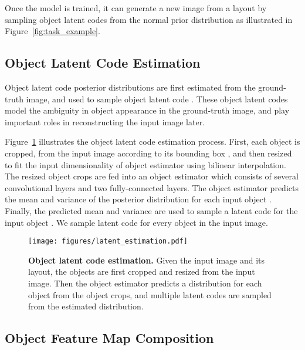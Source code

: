 \documentclass[10pt,twocolumn,letterpaper]{article}
\begin{document}
Once the model is trained, it can generate a new image from a layout by sampling object latent codes from the normal prior distribution  as illustrated in Figure~\ref{fig:task_example}.









\subsection{Object Latent Code Estimation}
Object latent code posterior distributions are first estimated from the ground-truth image, and used to sample object latent code . 
These object latent codes model the ambiguity in object appearance in the ground-truth image, and play important roles in reconstructing the input image later.

Figure~\ref{fig:latent_code_estimation} illustrates the object latent code estimation process.
First, each object  is cropped, from the input image  according to its bounding box , and then resized to fit the input dimensionality of object estimator using bilinear interpolation. 
The resized object crops are fed into an object estimator which consists of several convolutional layers and two fully-connected layers. The object estimator predicts the mean and variance of the posterior distribution for each input object . 
Finally, the predicted mean and variance are used to sample a latent code  for the input object .
We sample latent code for every object in the input image.

\begin{figure}[!t]
    \begin{center}
\texttt{[image: figures/latent\_estimation.pdf]}
    \end{center}
    \caption{{\bf Object latent code estimation.} Given the input image and its layout, the objects are first cropped and resized from the input image. Then the object estimator predicts a distribution for each object from the object crops, and multiple latent codes are sampled from the estimated distribution.}
    \label{fig:latent_code_estimation}
    \vspace{-0.1in}
\end{figure}

\subsection{Object Feature Map Composition}
\end{document}
